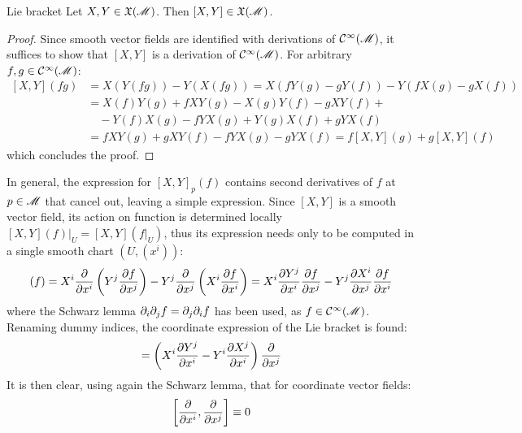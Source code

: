 \begin{lemma}{Lie bracket}{}
  Let $ X,Y \in \mathfrak{X}(\mathscr{M}) $. Then $ [X,Y] \in \mathfrak{X}(\mathscr{M}) $.
\end{lemma}

\begin{proofbox}
  \begin{proof}
    Since smooth vector fields are identified with derivations of $ \mathcal{C}^{\infty}(\mathscr{M}) $, it suffices to show that $ [X,Y] $ is a derivation of $ \mathcal{C}^{\infty}(\mathscr{M}) $. For arbitrary $ f,g \in \mathcal{C}^{\infty}(\mathscr{M}) $:
    \begin{equation*}
      \begin{split}
        [X,Y](fg)
        & = X(Y(fg)) - Y(X(fg)) = X(f Y(g) - g Y(f)) - Y(f X(g) - g X(f)) \\
        & = X(f) Y(g) + f XY(g) - X(g) Y(f) - g XY(f) + \\
        & \quad - Y(f) X(g) - f YX(g) + Y(g) X(f) + g YX(f) \\
        & = f XY(g) + g XY(f) - f YX(g) - g YX(f) = f [X,Y](g) + g [X,Y](f)
      \end{split}
    \end{equation*}
    which concludes the proof.
  \end{proof}
\end{proofbox}

In general, the expression for $ [X,Y]_p(f) $ contains second derivatives of $ f $ at $ p \in \mathscr{M} $ that cancel out, leaving a simple expression. Since $ [X,Y] $ is a smooth vector field, its action on function is determined locally $ [X,Y](f) \vert_U = [X,Y](f\vert_U) $, thus its expression needs only to be computed in a single smooth chart $ (U,(x^i)) $:
\begin{equation*}
  [X,Y](f) = X^i \frac{\pa}{\pa x^i} \left( Y^j \frac{\pa f}{\pa x^j} \right) - Y^j \frac{\pa}{\pa x^j} \left( X^i \frac{\pa f}{\pa x^i} \right) = X^i \frac{\pa Y^j}{\pa x^i} \frac{\pa f}{\pa x^j} - Y^j \frac{\pa X^i}{\pa x^j} \frac{\pa f}{\pa x^i}
\end{equation*}
where the Schwarz lemma $ \partial_i \partial_j f = \partial_j \partial_i f $ has been used, as $ f \in \mathcal{C}^{\infty}(\mathscr{M}) $. Renaming dummy indices, the coordinate expression of the Lie bracket is found:
\begin{equation}
  [X,Y] = \left( X^i \frac{\pa Y^j}{\pa x^i} - Y^i \frac{\pa X^j}{\pa x^i} \right) \frac{\pa}{\pa x^j}
  \label{eq:lie-bra-comp}
\end{equation}
It is then clear, using again the Schwarz lemma, that for coordinate vector fields:
\begin{equation*}
  \left[ \frac{\partial}{\partial x^i} , \frac{\partial}{\partial x^j} \right] \equiv 0
\end{equation*}

